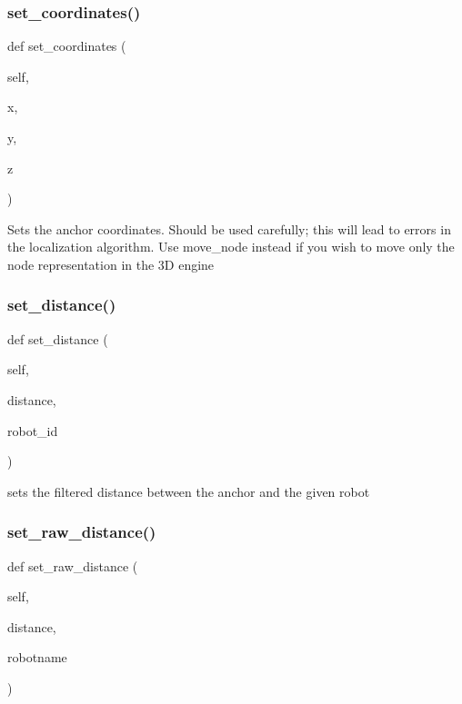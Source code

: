 \subsubsection{\texorpdfstring{set\+\_\+coordinates()}{set\_coordinates()}}
{\footnotesize\ttfamily def set\+\_\+coordinates (\begin{DoxyParamCaption}\item[{}]{self,  }\item[{}]{x,  }\item[{}]{y,  }\item[{}]{z }\end{DoxyParamCaption})}

\begin{DoxyVerb}Sets the anchor coordinates. Should be used carefully; this will lead to errors in the localization algorithm.
Use move_node instead if you wish to move only the node representation in the 3D engine\end{DoxyVerb}
 \mbox{\label{classanchor_1_1_anchor_a57e1332ae74ab25661204f5fc27c92e7}} 
\subsubsection{\texorpdfstring{set\+\_\+distance()}{set\_distance()}}
{\footnotesize\ttfamily def set\+\_\+distance (\begin{DoxyParamCaption}\item[{}]{self,  }\item[{}]{distance,  }\item[{}]{robot\+\_\+id }\end{DoxyParamCaption})}

\begin{DoxyVerb}sets the filtered distance between the anchor and the given robot\end{DoxyVerb}
 \mbox{\label{classanchor_1_1_anchor_a158cf339169e35c40b2b72862ff5ccf8}} 
\subsubsection{\texorpdfstring{set\+\_\+raw\+\_\+distance()}{set\_raw\_distance()}}
{\footnotesize\ttfamily def set\+\_\+raw\+\_\+distance (\begin{DoxyParamCaption}\item[{}]{self,  }\item[{}]{distance,  }\item[{}]{robotname }\end{DoxyParamCaption})}

